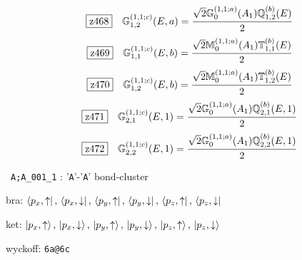 \documentclass[fleqn,10pt,landscape]{jsarticle}
\begin{document}
\begin{dmath*}
\hspace*{3mm}\fbox{z468}\quad \mathbb{G}_{1,2}^{(1,1;c)}(E,a)=\frac{\sqrt{2} \mathbb{G}_{0}^{(1,1;a)}(A_{1}) \mathbb{Q}_{1,2}^{(b)}(E)}{2}
\end{dmath*}
\begin{dmath*}
\hspace*{3mm}\fbox{z469}\quad \mathbb{G}_{1,1}^{(1,1;c)}(E,b)=\frac{\sqrt{2} \mathbb{M}_{0}^{(1,1;a)}(A_{1}) \mathbb{T}_{1,1}^{(b)}(E)}{2}
\end{dmath*}
\begin{dmath*}
\hspace*{3mm}\fbox{z470}\quad \mathbb{G}_{1,2}^{(1,1;c)}(E,b)=\frac{\sqrt{2} \mathbb{M}_{0}^{(1,1;a)}(A_{1}) \mathbb{T}_{1,2}^{(b)}(E)}{2}
\end{dmath*}
\begin{dmath*}
\hspace*{3mm}\fbox{z471}\quad \mathbb{G}_{2,1}^{(1,1;c)}(E,1)=\frac{\sqrt{2} \mathbb{G}_{0}^{(1,1;a)}(A_{1}) \mathbb{Q}_{2,1}^{(b)}(E,1)}{2}
\end{dmath*}
\begin{dmath*}
\hspace*{3mm}\fbox{z472}\quad \mathbb{G}_{2,2}^{(1,1;c)}(E,1)=\frac{\sqrt{2} \mathbb{G}_{0}^{(1,1;a)}(A_{1}) \mathbb{Q}_{2,2}^{(b)}(E,1)}{2}
\end{dmath*}
\vspace{5mm}

\noindent\textbullet\, \texttt{A;A_001_1} : '\texttt{A}'-'\texttt{A}' bond-cluster

\noindent\quad * bra: $\bra{p_{x},\uparrow},\, \bra{p_{x},\downarrow},\, \bra{p_{y},\uparrow},\, \bra{p_{y},\downarrow},\, \bra{p_{z},\uparrow},\, \bra{p_{z},\downarrow}$

\noindent\quad * ket: $\ket{p_{x},\uparrow},\, \ket{p_{x},\downarrow},\, \ket{p_{y},\uparrow},\, \ket{p_{y},\downarrow},\, \ket{p_{z},\uparrow},\, \ket{p_{z},\downarrow}$

\noindent\quad * wyckoff: \texttt{6a@6c}
\end{document}
